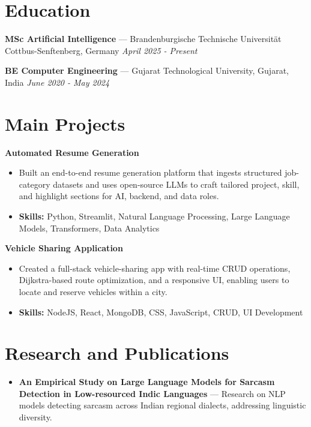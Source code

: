 \documentclass[a4paper,10pt]{article}
\begin{document}
\section*{Education}
\textbf{MSc Artificial Intelligence} — Brandenburgische Technische Universität Cottbus-Senftenberg, Germany \hfill \textit{April 2025 - Present}\par
\vspace{1.5pt}
\textbf{BE Computer Engineering} — Gujarat Technological University, Gujarat, India \hfill \textit{June 2020 - May 2024}\par

\section*{Main Projects}
\textbf{Automated Resume Generation}\par
\vspace{1pt}
\begin{itemize}
  \item Built an end-to-end resume generation platform that ingests structured job-category datasets and uses open-source LLMs to craft tailored project, skill, and highlight sections for AI, backend, and data roles.
  \item \textbf{Skills:} Python, Streamlit, Natural Language Processing, Large Language Models, Transformers, Data Analytics
\end{itemize}
\vspace{3pt}
\textbf{Vehicle Sharing Application}\par
\vspace{1pt}
\begin{itemize}
  \item Created a full-stack vehicle-sharing app with real-time CRUD operations, Dijkstra-based route optimization, and a responsive UI, enabling users to locate and reserve vehicles within a city.
  \item \textbf{Skills:} NodeJS, React, MongoDB, CSS, JavaScript, CRUD, UI Development
\end{itemize}

\section*{Research and Publications}
\begin{itemize}
\item \textbf{An Empirical Study on Large Language Models for Sarcasm Detection in Low-resourced Indic Languages} — Research on NLP models detecting sarcasm across Indian regional dialects, addressing linguistic diversity.
\end{itemize}
\end{document}
